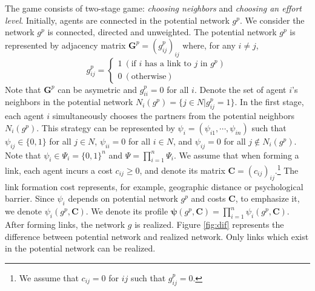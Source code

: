 \documentclass[12pt]{article}
\theoremstyle{definition}
\begin{document}
The game consists of two-stage game: {\it{choosing neighbors}} and {\it{choosing an effort level}}.
Initially, agents are connected in the potential network $g^p$.
We consider the network $g^p$ is connected, directed and unweighted.
The potential network $g^p$ is represented by adjacency matrix $\bm{G}^p = {(g_{ij}^p)}_{ij}$ where, for any $i \neq j$,
\[ g_{ij}^p =
	\begin{cases}
		1 \  (\text{if $i$ has a link to $j$ in $g^p $}) \\
		0 \  (\text{otherwise})
	\end{cases} \]
Note that $\bm{G}^p$ can be asymetric and $g_{ii}^p = 0$ for all $i$.
Denote the set of agent $i$'s neighbors in the potential network $N_i(g^p) = \{ j \in N | g_{ij}^p = 1 \}$.
In the first stage, each agent $i$ simultaneously chooses the partners from the potential neighbors $N_i(g^p)$.
This strategy can be represented by $\psi_i = (\psi_{i1}, \cdots, \psi_{in})$ such that $\psi_{ij} \in \{0, 1\}$ for all $j \in N$, $\psi_{ii}=0$ for all $i \in N$, and $\psi_{ij} = 0$ for all $j \notin N_i(g^p)$.
Note that $\psi_i \in \Psi_i = \{0, 1\}^{n}$ and $\Psi = \prod_{i=1}^n \Psi_i$.
We assume that when forming a link, each agent incurs a cost $c_{ij} \ge 0$, and denote its matrix $\bm{C} = {(c_{ij})}_{ij}$.\footnote{We assume that $c_{ij} = 0$ for $ij$ such that $g_{ij}^p = 0$.}
The link formation cost represents, for example, geographic distance or psychological barrier.
Since $\psi_i$ depends on potential network $g^p$ and costs $\bm{C}$, to emphasize it, we denote $\psi_i(g^p, \bm{C})$.
We denote its profile $\bm{\psi}(g^p, \bm{C}) = \prod_{i=1}^n \psi_i(g^p, \bm{C})$.
After forming links, the network $g$ is realized.
Figure \ref{fig:dif} represents the difference between potential network and realized network.
Only links which exist in the potential network can be realized.
\end{document}
